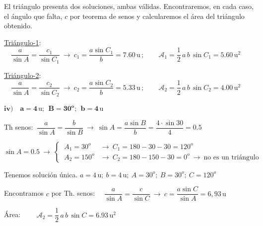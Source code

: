 \begin{miejercicio}
\vspace{2mm} El triángulo presenta dos soluciones, ambas válidas. Encontraremos, en cada caso, el ángulo que falta, $c$ por teorema de senos y calcularemos el área del triángulo obtenido.

\vspace{2mm} \underline{Triángulo-1}:$\quad \dfrac{a}{\sin A}=\dfrac{c_1}{\sin C_1} \ \to \ c_1=\dfrac{a\sin C_1}{b}= 7.60\, \mathrm{u}\,;\qquad \mathcal A_1=\dfrac 1 2 \, a\, b\, \sin C_1 = 5.60\, \mathrm{u}^2$

\vspace{2mm} \underline{Triángulo-2}:$\quad \dfrac{a}{\sin A}=\dfrac{c_2}{\sin C_2} \ \to \ c_2=\dfrac{a\sin C_2}{b}= 5.33\, \mathrm{u}\,;\qquad \mathcal A_2=\dfrac 1 2 \, a\, b\, \sin C_2 = 4.00\, \mathrm{u}^2$


\vspace{6mm} $\boldsymbol{ iv) \quad a= 4\, \mathrm{u};\ \ B=30^o;\ \ b=4\, \mathrm{u} }$

\vspace{2mm}Th senos: $\ \dfrac{a}{\sin A}=\dfrac{b}{\sin B} \ \to \ \sin A=\dfrac{a\sin B}{b}=\dfrac{4\cdot \sin 30}{4}=0.5 $

\vspace{2mm} $\sin A=0.5 \ \to \ \begin{cases}  
\ A_1=30^o  &\to \ C_1=180-30-30=120^o
\\ 
\ A_2=150^o &\to \ C_2=180-150-30=0^o \ \to \ \text{no es un triángulo}
\end{cases}$

\vspace{2mm} Tenemos solución única. $a=4\, \mathrm{u};\ b=4\, \mathrm{u};\ A=30^o;\ B=30^o;\ C=120^o$ 

\vspace{2mm} Encontramos $c$ por Th. senos: $\quad \dfrac{a}{\sin A}=\dfrac{c}{\sin C} \ \to \ c=\dfrac{a\sin C}{\sin A}= 6,93\, \mathrm{u} $

\vspace{2mm} Área: $\qquad \mathcal A_2=\dfrac 1 2 \, a\, b\, \sin C = 6.93\, \mathrm{u}^2$

\vspace{2mm}

\vspace{2mm}

	
\end{miejercicio}

